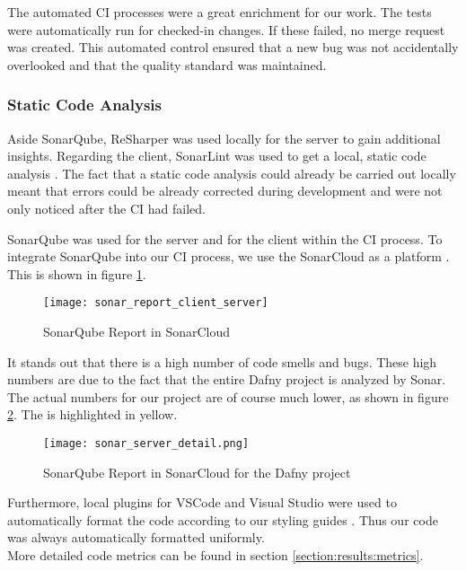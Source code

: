 The automated CI processes were a great enrichment for our work.
The tests were automatically run for checked-in changes.
If these failed, no merge request was created.
This automated control ensured that a new bug was not accidentally overlooked
and that the quality standard was maintained.

\subsubsection{Static Code Analysis}
Aside SonarQube, ReSharper was used locally for the server to gain additional insights.
Regarding the client, SonarLint was used to get a local, static code analysis \cite{sonar-lint}.
The fact that a static code analysis could already be carried out locally meant that errors
could be already corrected during development and were not only noticed after the CI had failed.

SonarQube was used for the server and for the client within the CI process.
To integrate SonarQube into our CI process, we use the SonarCloud as a platform \cite{sonarcloud}.
This is shown in figure \ref{fig:sonarcloud_report}.


\begin{figure}[H]
    \centering
    \texttt{[image: sonar\_report\_client\_server]}
    \caption{SonarQube Report in SonarCloud}
    \label{fig:sonarcloud_report}
\end{figure}

It stands out that there is a high number of code smells and bugs.
These high numbers are due to the fact that the entire Dafny project is analyzed by Sonar.
The actual numbers for our project are of course much lower,
as shown in figure \ref{fig:sonar_server_detail}.
The  is highlighted in yellow.

\begin{figure}[H]
    \centering
    \texttt{[image: sonar\_server\_detail.png]}
    \caption{SonarQube Report in SonarCloud for the Dafny project}
    \label{fig:sonar_server_detail}
\end{figure}

Furthermore, local plugins for VSCode and Visual Studio were used to automatically
format the code according to our styling guides \cite{dev}.
Thus our code was always automatically formatted uniformly. \\

More detailed code metrics can be found in section \ref{section:results:metrics}.

